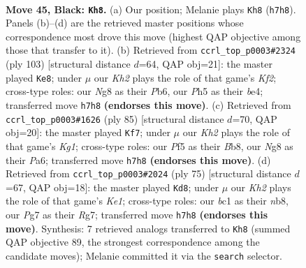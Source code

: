 \documentclass[11pt]{article}
\begin{document}
\clearpage

\begin{figure}[p]\centering
\begin{subfigure}{0.46\textwidth}\centering
\resizebox{\linewidth}{!}{%
\newchessgame
\chessboard[
  setfen={2r2bn1/p5pk/P1b5/1p3p1p/1P3P2/4P1P1/1R6/RNB3K1 b - - 5 45},
  showmover=false,
  pgfstyle=straightmove, color=movearrow, markmove={h7-h8}
]}
\caption{}
\end{subfigure}\hfill
\begin{subfigure}{0.46\textwidth}\centering
\resizebox{\linewidth}{!}{%
\newchessgame
\chessboard[
  setfen={3r1b2/5k2/1p2p2p/p3p1p1/4B1P1/P1P1R2P/1P3P2/4K3 b - - 26 52},
  showmover=false,
  pgfstyle=straightmove, color=movearrow, markmove={f7-e8}
]}
\caption{}
\end{subfigure}
\\[4pt]
\begin{subfigure}{0.46\textwidth}\centering
\resizebox{\linewidth}{!}{%
\newchessgame
\chessboard[
  setfen={1b1r2k1/3b4/p4pp1/3P4/p2P2P1/P6P/1P4N1/K1R3B1 b - - 0 43},
  showmover=false,
  pgfstyle=straightmove, color=movearrow, markmove={g8-f7}
]}
\caption{}
\end{subfigure}\hfill
\begin{subfigure}{0.46\textwidth}\centering
\resizebox{\linewidth}{!}{%
\newchessgame
\chessboard[
  setfen={1N2kb2/6rp/1p4p1/4Pp2/p2p1P1P/Pb6/1P1B2P1/2R3K1 b - - 6 38},
  showmover=false,
  pgfstyle=straightmove, color=movearrow, markmove={e8-d8}
]}
\caption{}
\end{subfigure}
\caption{\textbf{Move 45, Black: \texttt{Kh8}.} (a) Our position; Melanie plays \texttt{Kh8} (\texttt{h7h8}). Panels (b)--(d) are the retrieved master positions whose correspondence most drove this move (highest QAP objective among those that transfer to it). (b) Retrieved from \texttt{ccrl\_top\_p0003\#2324} (ply 103) [structural distance $d$=64, QAP obj=21]: the master played \texttt{Ke8}; under $\mu$ our \emph{Kh2} plays the role of that game's \emph{Kf2}; cross-type roles: our \emph{N}g8 as their \emph{P}b6, our \emph{P}h5 as their \emph{b}e4; transferred move \texttt{h7h8} \textbf{(endorses this move)}. (c) Retrieved from \texttt{ccrl\_top\_p0003\#1626} (ply 85) [structural distance $d$=70, QAP obj=20]: the master played \texttt{Kf7}; under $\mu$ our \emph{Kh2} plays the role of that game's \emph{Kg1}; cross-type roles: our \emph{P}f5 as their \emph{B}b8, our \emph{N}g8 as their \emph{P}a6; transferred move \texttt{h7h8} \textbf{(endorses this move)}. (d) Retrieved from \texttt{ccrl\_top\_p0003\#2024} (ply 75) [structural distance $d$=67, QAP obj=18]: the master played \texttt{Kd8}; under $\mu$ our \emph{Kh2} plays the role of that game's \emph{Ke1}; cross-type roles: our \emph{b}c1 as their \emph{n}b8, our \emph{P}g7 as their \emph{R}g7; transferred move \texttt{h7h8} \textbf{(endorses this move)}. Synthesis: 7 retrieved analogs transferred to \texttt{Kh8} (summed QAP objective 89, the strongest correspondence among the candidate moves); Melanie committed it via the \texttt{search} selector.}
\label{fig:thought-m89}
\end{figure}
\end{document}
